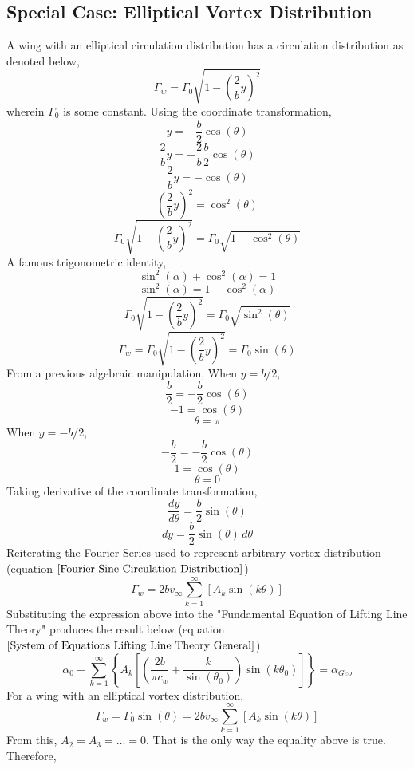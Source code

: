 \documentclass[a4paper, 12pt]{report}
\begin{document}
\begin{center}
\subsection{Special Case: Elliptical Vortex Distribution}
\begin{comment}
\end{comment}
A wing with an elliptical circulation distribution has a circulation distribution as denoted below,
$$\Gamma_{w} = \Gamma_{0}\sqrt{1-\left(\frac{2}{b}y\right)^{2}}$$
wherein $\Gamma_{0}$ is some constant. Using the coordinate transformation, 
$$y = -\frac{b}{2}\cos(\theta)$$
$$\frac{2}{b}y = -\frac{2}{b}\frac{b}{2}\cos(\theta)$$
$$\frac{2}{b}y = -\cos(\theta)$$
$$\left(\frac{2}{b}y\right)^{2} = \cos^{2}(\theta)$$
$$\Gamma_{0}\sqrt{1-\left(\frac{2}{b}y\right)^{2}} = \Gamma_{0}\sqrt{1-\cos^{2}(\theta)}$$
A famous trigonometric identity,
$$\sin^{2}(\alpha) + \cos^{2}(\alpha) = 1$$
$$\sin^{2}(\alpha) = 1 - \cos^{2}(\alpha)$$
$$\Gamma_{0}\sqrt{1-\left(\frac{2}{b}y\right)^{2}} = \Gamma_{0}\sqrt{\sin^{2}(\theta)}$$
\begin{equation}
\Gamma_{w} = \Gamma_{0}\sqrt{1-\left(\frac{2}{b}y\right)^{2}} = \Gamma_{0}\sin(\theta)
\label{elliptical circulation distribution th coordinates}
\end{equation}
From a previous algebraic manipulation, When $y = b/2$,
$$\frac{b}{2} = -\frac{b}{2}\cos(\theta)$$
$$-1 = \cos(\theta)$$
$$\theta = \pi$$
When $y = -b/2$,
$$-\frac{b}{2} = -\frac{b}{2}\cos(\theta)$$
$$1 = \cos(\theta)$$
$$\theta = 0$$
Taking derivative of the coordinate transformation,
$$\frac{dy}{d\theta} = \frac{b}{2}\sin(\theta)$$
\begin{equation}
dy = \frac{b}{2}\sin(\theta)\,d\theta
\label{dy in terms of th lifting line coordinates}
\end{equation}
Reiterating the Fourier Series used to represent arbitrary vortex distribution (equation $\ref{Fourier Sine Circulation Distribution}$) 
$$\Gamma_{w} = 2bv_{\infty}\sum^{\infty}_{k = 1}\left[A_{k}\sin(k\theta)\right]$$
Substituting the expression above into the "Fundamental Equation of Lifting Line Theory" produces the result below (equation $\ref{System of Equations Lifting Line Theory General}$)
$$\alpha_{0} + \sum^{\infty}_{k = 1}\left\{A_{k}\left[\left(\frac{2b}{\pi c_{w}} + \frac{k}{\sin(\theta_{0})}\right)\sin(k\theta_{0})\right]\right\} = \alpha_{Geo}$$
For a wing with an elliptical vortex distribution,
$$\Gamma_{w} = \Gamma_{0}\sin(\theta) = 2bv_{\infty}\sum^{\infty}_{k = 1}\left[A_{k}\sin(k\theta)\right]$$
From this, $A_{2} = A_{3} = \dots = 0$. That is the only way the equality above is true. Therefore,

\end{center}
\end{document}
